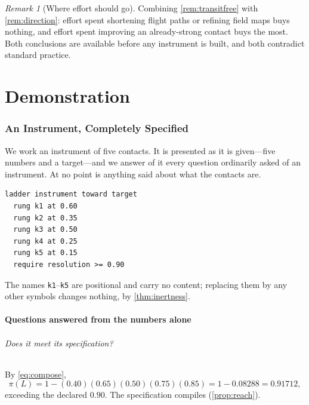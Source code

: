 \documentclass[11pt,a4paper]{article}
\theoremstyle{plain}
\theoremstyle{definition}
\theoremstyle{remark}
\newtheorem{remark}[theorem]{Remark}
\newcommand{\pow}{\pi}
\newcommand{\Lad}{L}
\begin{document}
\begin{remark}[Where effort should go]
\label{rem:whereeffort}
Combining \cref{rem:transitfree} with \cref{rem:direction}: effort spent
shortening flight paths or refining field maps buys nothing, and effort spent
improving an already-strong contact buys the most. Both conclusions are
available before any instrument is built, and both contradict standard practice.
\end{remark}

\part{Demonstration}
\label{part:demo}

\section{An Instrument, Completely Specified}
\label{sec:demo}

We work an instrument of five contacts. It is presented as it is given---five
numbers and a target---and we answer of it every question ordinarily asked of an
instrument. At no point is anything said about what the contacts are.

\begin{lstlisting}[caption={An instrument, completely specified.},captionpos=b,label=lst:instr]
ladder instrument toward target
  rung k1 at 0.60
  rung k2 at 0.35
  rung k3 at 0.50
  rung k4 at 0.25
  rung k5 at 0.15
  require resolution >= 0.90
\end{lstlisting}

The names \texttt{k1}--\texttt{k5} are positional and carry no content;
replacing them by any other symbols changes nothing, by \cref{thm:inertness}.

\subsection{Questions answered from the numbers alone}

\paragraph{Does it meet its specification?}
By \cref{eq:compose},
\[
\pow(\Lad) = 1 - (0.40)(0.65)(0.50)(0.75)(0.85) = 1 - 0.08288 = 0.91712,
\]
exceeding the declared $0.90$. The specification compiles
(\cref{prop:reach}).
\end{document}
